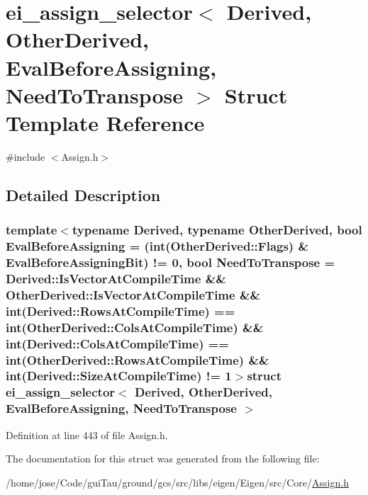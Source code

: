 \hypertarget{structei__assign__selector}{\section{ei\-\_\-assign\-\_\-selector$<$ Derived, Other\-Derived, Eval\-Before\-Assigning, Need\-To\-Transpose $>$ Struct Template Reference}
\label{structei__assign__selector}
}


{\ttfamily \#include $<$Assign.\-h$>$}



\subsection{Detailed Description}
\subsubsection*{template$<$typename Derived, typename Other\-Derived, bool Eval\-Before\-Assigning = (int(\-Other\-Derived\-::\-Flags) \& Eval\-Before\-Assigning\-Bit) != 0, bool Need\-To\-Transpose = Derived\-::\-Is\-Vector\-At\-Compile\-Time \&\& Other\-Derived\-::\-Is\-Vector\-At\-Compile\-Time \&\& int(\-Derived\-::\-Rows\-At\-Compile\-Time) == int(\-Other\-Derived\-::\-Cols\-At\-Compile\-Time) \&\& int(\-Derived\-::\-Cols\-At\-Compile\-Time) == int(\-Other\-Derived\-::\-Rows\-At\-Compile\-Time) \&\& int(\-Derived\-::\-Size\-At\-Compile\-Time) != 1$>$struct ei\-\_\-assign\-\_\-selector$<$ Derived, Other\-Derived, Eval\-Before\-Assigning, Need\-To\-Transpose $>$}



Definition at line 443 of file Assign.\-h.



The documentation for this struct was generated from the following file\-:\begin{DoxyCompactItemize}
\item 
/home/jose/\-Code/gui\-Tau/ground/gcs/src/libs/eigen/\-Eigen/src/\-Core/\hyperlink{_assign_8h}{Assign.\-h}\end{DoxyCompactItemize}
